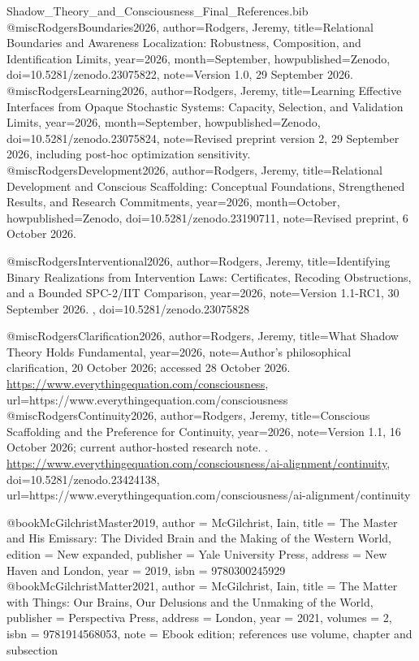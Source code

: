 \begin{filecontents*}[overwrite]{Shadow_Theory_and_Consciousness_Final_References.bib}
@misc{RodgersBoundaries2026,
 author={Rodgers, Jeremy},
 title={Relational Boundaries and Awareness Localization: Robustness, Composition, and Identification Limits},
 year={2026}, month={September}, howpublished={Zenodo},
 doi={10.5281/zenodo.23075822},
 note={Version 1.0, 29 September 2026. }
}
@misc{RodgersLearning2026,
 author={Rodgers, Jeremy},
 title={Learning Effective Interfaces from Opaque Stochastic Systems: Capacity, Selection, and Validation Limits},
 year={2026}, month={September}, howpublished={Zenodo},
 doi={10.5281/zenodo.23075824},
 note={Revised preprint version 2, 29 September 2026, including post-hoc optimization sensitivity. }
}
@misc{RodgersDevelopment2026,
 author={Rodgers, Jeremy},
 title={Relational Development and Conscious Scaffolding: Conceptual Foundations, Strengthened Results, and Research Commitments},
 year={2026}, month={October}, howpublished={Zenodo},
 doi={10.5281/zenodo.23190711},
 note={Revised preprint, 6 October 2026. }
}


@misc{RodgersInterventional2026,
 author={Rodgers, Jeremy},
 title={Identifying Binary Realizations from Intervention Laws: Certificates, Recoding Obstructions, and a Bounded {SPC-2/IIT} Comparison},
 year={2026},
 note={Version 1.1-RC1, 30 September 2026. },
 doi={10.5281/zenodo.23075828}
}

@misc{RodgersClarification2026,
 author={Rodgers, Jeremy}, title={What Shadow Theory Holds Fundamental},
 year={2026}, note={Author's philosophical clarification, 20 October 2026; accessed 28 October 2026. \url{https://www.everythingequation.com/consciousness}},
 url={https://www.everythingequation.com/consciousness}
}
@misc{RodgersContinuity2026,
 author={Rodgers, Jeremy}, title={Conscious Scaffolding and the Preference for Continuity},
 year={2026}, note={Version 1.1, 16 October 2026; current author-hosted research note. . \url{https://www.everythingequation.com/consciousness/ai-alignment/continuity}},
 doi={10.5281/zenodo.23424138},
 url={https://www.everythingequation.com/consciousness/ai-alignment/continuity}
}

@book{McGilchristMaster2019,
  author = {McGilchrist, Iain},
  title = {The Master and His Emissary: The Divided Brain and the Making of the Western World},
  edition = {New expanded},
  publisher = {Yale University Press},
  address = {New Haven and London},
  year = {2019},
  isbn = {9780300245929}
}
@book{McGilchristMatter2021,
  author = {McGilchrist, Iain},
  title = {The Matter with Things: Our Brains, Our Delusions and the Unmaking of the World},
  publisher = {Perspectiva Press},
  address = {London},
  year = {2021},
  volumes = {2},
  isbn = {9781914568053},
  note = {Ebook edition; references use volume, chapter and subsection}
}



\end{filecontents*}
